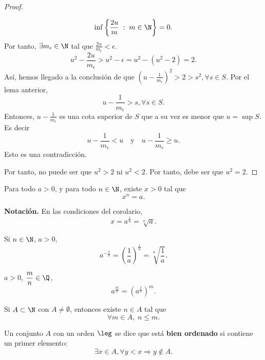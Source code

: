 \begin{proof}
\begin{description}
\[\inf \left\{ \frac{2u}{m} \; : \; m \in \N\right\} = 0 .\]
Por tanto, $\displaystyle \exists m_{\epsilon } \in \N $ tal que $\displaystyle \frac{2u}{m_{\epsilon }} < \epsilon  $.
\[u^{2} - \frac{2u}{m_{\epsilon }} > u^{2} - \epsilon = u^{2} - \left(u^{2} - 2\right) = 2 .\]
Así, hemos llegado a la conclusión de que $\displaystyle \left(u - \frac{1}{m_{\epsilon }}\right)^{2} > 2 > s^{2}, \forall s \in S $. Por el lema anterior, 
\[u - \frac{1}{m_{\epsilon }} > s, \forall s \in S .\]
Entonces, $\displaystyle u - \frac{1}{m_{\epsilon }} $ es una cota superior de $\displaystyle S $ que a su vez es menor que $\displaystyle u = \sup S $. Es decir
\[u - \frac{1}{m_{\epsilon }} < u \quad \text{y} \quad u - \frac{1}{m_{\epsilon }} \geq u .\]
Esto es una contradicción.
\end{description}
Por tanto, no puede ser que $\displaystyle u^{2}>2 $ ni $\displaystyle u^{2} <2 $. Por tanto, debe ser que $\displaystyle u^{2} = 2 $. 
\end{proof}

\begin{fcolorary}[]
\normalfont Para todo $\displaystyle a > 0 $, y para todo $\displaystyle n \in \N $, existe $\displaystyle x > 0 $ tal que 
\[x^{n} = a .\]
\end{fcolorary}

\textbf{Notación.} En las condiciones del corolario, 
\[x = a ^{\frac{1}{n}} = \sqrt[n]{a} .\]

\begin{fdefinition}[]
\normalfont Si $\displaystyle n \in \N $, $\displaystyle a > 0 $, 
\[a ^{- \frac{1}{n}} = \left(\frac{1}{a}\right)^{\frac{1}{n}} = \sqrt[n]{\frac{1}{a}} .\]
\end{fdefinition}

\begin{fdefinition}[]
\normalfont $\displaystyle a > 0 $, $\displaystyle \frac{m}{n} \in \Q $, 
\[a^{\frac{m}{n}} = \left(a^{\frac{1}{n}}\right)^{m} .\]
\end{fdefinition}

\begin{fprop}
\normalfont Si $\displaystyle A \subset \N $ con $\displaystyle A \neq \emptyset $, entonces existe $\displaystyle n \in A $ tal que 
\[\forall m \in A, \; n \leq m .\]
\end{fprop}

\begin{fdefinition}[]
\normalfont Un conjunto $\displaystyle A $ con un orden $\displaystyle \leg $ se dice que está \textbf{bien ordenado} si contiene un primer elemento:
\[\exists x \in A, \forall y < x \Rightarrow y \not\in A .\]

\end{fdefinition}

